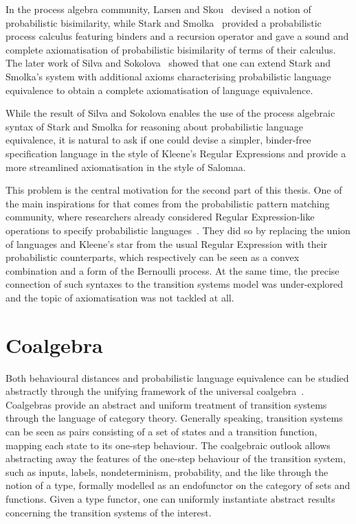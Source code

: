 In the process algebra community, Larsen and Skou~\cite{Larsen:1991:Bisimulation} devised a notion of probabilistic bisimilarity, while Stark and Smolka~\cite{Stark:2000:Complete} provided a probabilistic process calculus featuring binders and a recursion operator and gave a sound and complete axiomatisation of probabilistic bisimilarity of terms of their calculus. The later work of Silva and Sokolova~\cite{Silva:2011:Sound} showed that one can extend Stark and Smolka's system with additional axioms characterising probabilistic language equivalence to obtain a complete axiomatisation of language equivalence.

While the result of Silva and Sokolova enables the use of the process algebraic syntax of Stark and Smolka for reasoning about probabilistic language equivalence, it is natural to ask if one could devise a simpler, binder-free specification language in the style of Kleene's Regular Expressions and provide a more streamlined axiomatisation in the style of Salomaa.
	
	This problem is the central motivation for the second part of this thesis. One of the main inspirations for that comes from the probabilistic pattern matching community, where researchers already considered Regular Expression-like operations to specify probabilistic languages~\cite{Ross:2000:Probabilistic}. They did so by replacing the union of languages and Kleene's star from the usual Regular Expression with their probabilistic counterparts, which respectively can be seen as a convex combination and a form of the Bernoulli process. At the same time, the precise connection of such syntaxes to the transition systems model was under-explored~\cite{Beeh:2017:Transformations} and the topic of axiomatisation was not tackled at all. 


\section{Coalgebra}
Both behavioural distances and probabilistic language equivalence can be studied abstractly through the unifying framework of the universal coalgebra~\cite{Gumm:2000:Elements,Rutten:2000:Universal}. Coalgebras provide an abstract and uniform treatment of transition systems through the language of category theory. Generally speaking, transition systems can be seen as pairs consisting of a set of states and a transition function, mapping each state to its one-step behaviour. The coalgebraic outlook allows abstracting away the features of the one-step behaviour of the transition system, such as inputs, labels, nondeterminism, probability, and the like through the notion of a type, formally modelled as an endofunctor on the category of sets and functions. Given a type functor, one can uniformly instantiate abstract results concerning the transition systems of the interest. 

